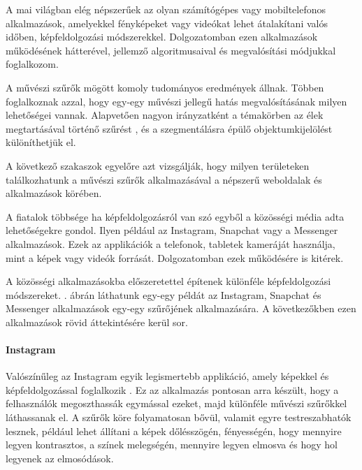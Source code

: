

A mai világban elég népszerűek az olyan számítógépes vagy mobiltelefonos alkalmazások, amelyekkel fényképeket vagy videókat lehet átalakítani valós időben, képfeldolgozási módszerekkel. Dolgozatomban ezen alkalmazások működésének hátterével, jellemző algoritmusaival és megvalósítási módjukkal foglalkozom.

A művészi szűrők mögött komoly tudományos eredmények állnak. Többen foglalkoznak azzal, hogy egy-egy művészi jellegű hatás megvalósításának milyen lehetőségei vannak. Alapvetően nagyon irányzatként a témakörben az élek megtartásával történő szűrést \cite{artistic}, és a szegmentálásra épülő objektumkijelölést \cite{intellipaint} különíthetjük el.

A következő szakaszok egyelőre azt vizsgálják, hogy milyen területeken találkozhatunk a művészi szűrők alkalmazásával a népszerű weboldalak és alkalmazások körében.


A fiatalok többsége ha képfeldolgozásról van szó egyből a közösségi média adta lehetőségekre gondol. Ilyen például az Instagram, Snapchat vagy a Messenger alkalmazások. Ezek az applikációk a telefonok, tabletek kameráját használja, mint a képek vagy videók forrását. Dolgozatomban ezek működésére is kitérek.


A közösségi alkalmazásokba előszeretettel építenek különféle képfeldolgozási módszereket. . ábrán láthatunk egy-egy példát az Instagram, Snapchat és Messenger alkalmazások egy-egy szűrőjének alkalmazására. A következőkben ezen alkalmazások rövid áttekintésére kerül sor.

\paragraph{Instagram} 

Valószínűleg az Instagram egyik legismertebb applikáció, amely képekkel és képfeldolgozással foglalkozik \cite{instagram}. Ez az alkalmazás pontosan arra készült, hogy a felhasználók megoszthassák egymással  ezeket, majd különféle művészi szűrőkkel láthassanak el. A szűrők köre folyamatosan bővül, valamit egyre testreszabhatók lesznek, például lehet állítani a képek dőlésszögén, fényességén, hogy mennyire legyen kontrasztos, a színek melegségén, mennyire legyen elmosva és hogy hol legyenek az elmosódások.


